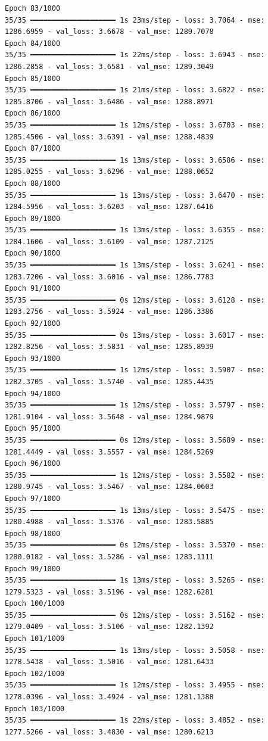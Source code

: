 \documentclass[
  letterpaper,
  DIV=11,
  numbers=noendperiod]{scrreprt}
\begin{document}
\begin{verbatim}
Epoch 83/1000
35/35 ━━━━━━━━━━━━━━━━━━━━ 1s 23ms/step - loss: 3.7064 - mse: 1286.6959 - val_loss: 3.6678 - val_mse: 1289.7078
Epoch 84/1000
35/35 ━━━━━━━━━━━━━━━━━━━━ 1s 22ms/step - loss: 3.6943 - mse: 1286.2858 - val_loss: 3.6581 - val_mse: 1289.3049
Epoch 85/1000
35/35 ━━━━━━━━━━━━━━━━━━━━ 1s 21ms/step - loss: 3.6822 - mse: 1285.8706 - val_loss: 3.6486 - val_mse: 1288.8971
Epoch 86/1000
35/35 ━━━━━━━━━━━━━━━━━━━━ 1s 12ms/step - loss: 3.6703 - mse: 1285.4506 - val_loss: 3.6391 - val_mse: 1288.4839
Epoch 87/1000
35/35 ━━━━━━━━━━━━━━━━━━━━ 1s 13ms/step - loss: 3.6586 - mse: 1285.0255 - val_loss: 3.6296 - val_mse: 1288.0652
Epoch 88/1000
35/35 ━━━━━━━━━━━━━━━━━━━━ 1s 13ms/step - loss: 3.6470 - mse: 1284.5956 - val_loss: 3.6203 - val_mse: 1287.6416
Epoch 89/1000
35/35 ━━━━━━━━━━━━━━━━━━━━ 1s 13ms/step - loss: 3.6355 - mse: 1284.1606 - val_loss: 3.6109 - val_mse: 1287.2125
Epoch 90/1000
35/35 ━━━━━━━━━━━━━━━━━━━━ 1s 13ms/step - loss: 3.6241 - mse: 1283.7206 - val_loss: 3.6016 - val_mse: 1286.7783
Epoch 91/1000
35/35 ━━━━━━━━━━━━━━━━━━━━ 0s 12ms/step - loss: 3.6128 - mse: 1283.2756 - val_loss: 3.5924 - val_mse: 1286.3386
Epoch 92/1000
35/35 ━━━━━━━━━━━━━━━━━━━━ 0s 13ms/step - loss: 3.6017 - mse: 1282.8256 - val_loss: 3.5831 - val_mse: 1285.8939
Epoch 93/1000
35/35 ━━━━━━━━━━━━━━━━━━━━ 1s 12ms/step - loss: 3.5907 - mse: 1282.3705 - val_loss: 3.5740 - val_mse: 1285.4435
Epoch 94/1000
35/35 ━━━━━━━━━━━━━━━━━━━━ 1s 12ms/step - loss: 3.5797 - mse: 1281.9104 - val_loss: 3.5648 - val_mse: 1284.9879
Epoch 95/1000
35/35 ━━━━━━━━━━━━━━━━━━━━ 0s 12ms/step - loss: 3.5689 - mse: 1281.4449 - val_loss: 3.5557 - val_mse: 1284.5269
Epoch 96/1000
35/35 ━━━━━━━━━━━━━━━━━━━━ 1s 12ms/step - loss: 3.5582 - mse: 1280.9745 - val_loss: 3.5467 - val_mse: 1284.0603
Epoch 97/1000
35/35 ━━━━━━━━━━━━━━━━━━━━ 1s 13ms/step - loss: 3.5475 - mse: 1280.4988 - val_loss: 3.5376 - val_mse: 1283.5885
Epoch 98/1000
35/35 ━━━━━━━━━━━━━━━━━━━━ 0s 12ms/step - loss: 3.5370 - mse: 1280.0182 - val_loss: 3.5286 - val_mse: 1283.1111
Epoch 99/1000
35/35 ━━━━━━━━━━━━━━━━━━━━ 1s 13ms/step - loss: 3.5265 - mse: 1279.5323 - val_loss: 3.5196 - val_mse: 1282.6281
Epoch 100/1000
35/35 ━━━━━━━━━━━━━━━━━━━━ 0s 12ms/step - loss: 3.5162 - mse: 1279.0409 - val_loss: 3.5106 - val_mse: 1282.1392
Epoch 101/1000
35/35 ━━━━━━━━━━━━━━━━━━━━ 1s 13ms/step - loss: 3.5058 - mse: 1278.5438 - val_loss: 3.5016 - val_mse: 1281.6433
Epoch 102/1000
35/35 ━━━━━━━━━━━━━━━━━━━━ 1s 12ms/step - loss: 3.4955 - mse: 1278.0396 - val_loss: 3.4924 - val_mse: 1281.1388
Epoch 103/1000
35/35 ━━━━━━━━━━━━━━━━━━━━ 1s 22ms/step - loss: 3.4852 - mse: 1277.5266 - val_loss: 3.4830 - val_mse: 1280.6213

\end{verbatim}
\end{document}
